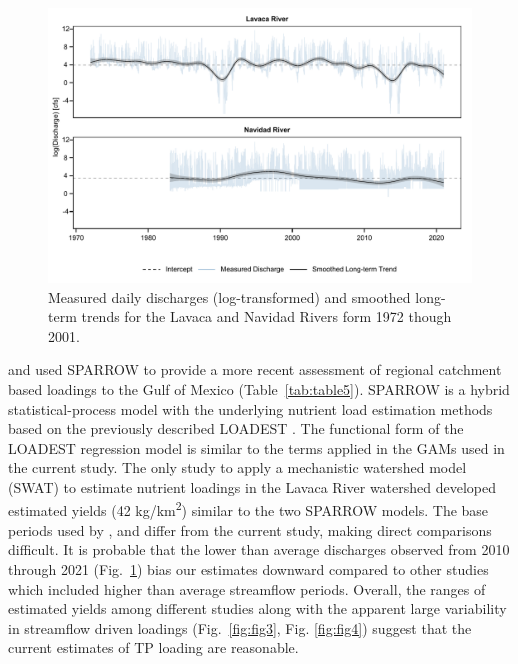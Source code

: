 \documentclass[fleqn,10pt,lineno]{wlpeerj} %
\begin{document}
\begin{figure}

{\centering \includegraphics[width=1\linewidth,]{../fig8} 

}

\caption{Measured daily discharges (log-transformed) and smoothed long-term trends for the Lavaca and Navidad Rivers form 1972 though 2001.}\label{fig:fig8}
\end{figure}

\textcite{rebichSourcesDeliveryNutrients2011} and
\textcite{wise_spatially_2019} used SPARROW to provide a more recent
assessment of regional catchment based loadings to the Gulf of Mexico
(Table~\ref{tab:table5}). SPARROW is a hybrid statistical-process model
with the underlying nutrient load estimation methods based on the
previously described LOADEST
\autocite{schwarzSPARROWSurfaceWaterQuality2006}. The functional form of
the LOADEST regression model is similar to the terms applied in the GAMs
used in the current study. The only study to apply a mechanistic
watershed model (SWAT) to estimate nutrient loadings in the Lavaca River
watershed \textcite{omaniEstimationSedimentNutrient2014} developed
estimated yields (42 kg/km\textsuperscript{2}) similar to the two
SPARROW models. The base periods used by
\textcite{rebichSourcesDeliveryNutrients2011},
\textcite{omaniEstimationSedimentNutrient2014} and
\textcite{wise_spatially_2019} differ from the current study, making
direct comparisons difficult. It is probable that the lower than average
discharges observed from 2010 through 2021 (Fig.~\ref{fig:fig8}) bias
our estimates downward compared to other studies which included higher
than average streamflow periods. Overall, the ranges of estimated yields
among different studies along with the apparent large variability in
streamflow driven loadings (Fig.~\ref{fig:fig3}, Fig. \ref{fig:fig4})
suggest that the current estimates of TP loading are reasonable.
\end{document}
